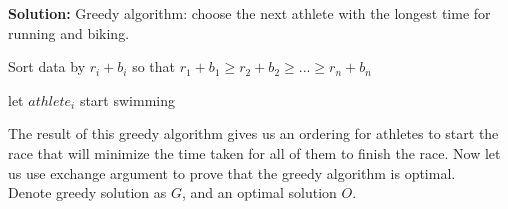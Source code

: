 \documentclass{article}
\begin{document}
\begin{tcolorbox}
\textbf{Solution:} Greedy algorithm: choose the next athlete with the longest time for running and biking. 
\begin{algorithm}[H]
			\SetAlgoLined
			
			Sort data by $r_i + b_i$ so that $r_1 + b_1 \geq r_2 + b_2 \geq ... \geq r_n + b_n$\;
			
			 {
            			{let $athlete_i$ start swimming}
			         			                  			
			}
		\end{algorithm}	

The result of this greedy algorithm gives us an ordering for athletes to start the race that will minimize the time taken for all of them to finish the race. Now let us use exchange argument to prove that the greedy algorithm is optimal. \\
Denote greedy solution as $G$, and an optimal solution $O$. 
\end{tcolorbox}
\end{document}
